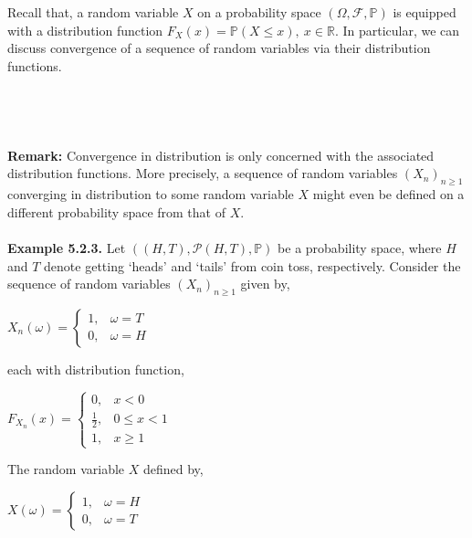 \documentclass{article}
\begin{document}
Recall that, a random variable $X$ on a probability space $(\Omega,\mathcal{F},\mathbb{P})$ is equipped with a distribution function $F_X(x) = \mathbb{P}(X \leq x), \ x\in\mathbb{R}$. In particular, we can discuss convergence of a sequence of random variables via their distribution functions.\\\\
\noindent{}\\\\\\
\textbf{Remark:} Convergence in distribution is only concerned with the associated distribution functions. More precisely, a sequence of random variables $(X_n)_{n\geq1}$ converging in distribution to some random variable $X$ might even be defined on a different probability space from that of $X$.\\\\
\textbf{Example 5.2.3.} Let $((H,T),\mathcal{P}(H,T),\mathbb{P})$ be a probability space, where $H$ and $T$ denote getting ‘heads’ and ‘tails’ from coin toss, respectively. Consider the sequence of random variables $(X_n)_{n\geq1}$ given by,
\begin{center}
	$X_n(\omega) = 
	\begin{cases}
	1, & \omega = T\\
	0, & \omega = H
	\end{cases}$
\end{center}
each with distribution function,
\begin{center}
	$F_{X_n}(x) = 
	\begin{cases}
	0, & x < 0 \\
	\frac{1}{2}, & 0 \leq x < 1 \\
	1, & x \geq 1
	\end{cases}$
\end{center}
The random variable $X$ defined by,
\begin{center}
	$X(\omega) = 
	\begin{cases}
	1, & \omega = H\\
	0, & \omega = T
	\end{cases}$
\end{center}
\end{document}
